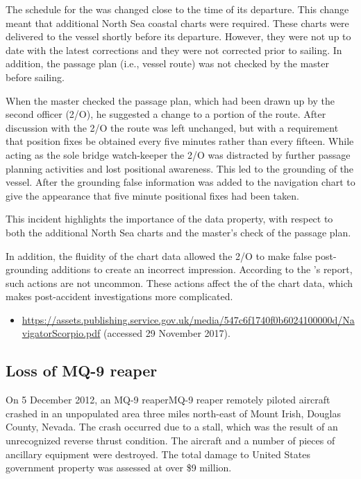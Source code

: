 The schedule for the  was changed close to the time of its departure. This change meant that additional North Sea coastal charts were required. These charts were delivered to the vessel shortly before its departure. However, they were not up to date with the latest corrections and they were not corrected prior to sailing. In addition, the passage plan (i.e., vessel route) was not checked by the master before sailing.

When the master checked the passage plan, which had been drawn up by the second officer (2/O), he suggested a change to a portion of the route. After discussion with the 2/O the route was left unchanged, but with a requirement that position fixes be obtained every five minutes rather than every fifteen. While acting as the sole bridge watch-keeper the 2/O was distracted by further passage planning activities and lost positional awareness. This led to the grounding of the vessel. After the grounding false \gls{information} was added to the navigation chart to give the appearance that five minute positional fixes had been taken.

This incident highlights the importance of the  \gls{data property}, with respect to both the additional North Sea charts and the master's check of the passage plan.

In addition, the fluidity of the chart data allowed the 2/O to make false post-grounding additions to create an incorrect impression. According to the 's report, such actions are not uncommon. These actions affect the  of the chart data, which makes post-accident investigations more complicated.

\begin{samepage}
\begin{itemize}
  \item \raggedright{\href{https://assets.publishing.service.gov.uk/media/547c6f1740f0b6024100000d/NavigatorScorpio.pdf}{https://assets.publishing.service.gov.uk/media/547c6f1740f0b6024100000d/NavigatorScorpio.pdf} (accessed 29 November 2017).}
\end{itemize}
\end{samepage}


\subsection{Loss of MQ-9 reaper} \label{bkm:incacc:mq9reaper}
On 5 December 2012, an MQ-9 reaperMQ-9 reaper remotely piloted aircraft crashed in an unpopulated area three miles north-east of Mount Irish, Douglas County, Nevada. The crash occurred due to a stall, which was the result of an unrecognized reverse thrust condition. The aircraft and a number of pieces of ancillary equipment were destroyed. The total damage to United States government property was assessed at over \$9 million.


